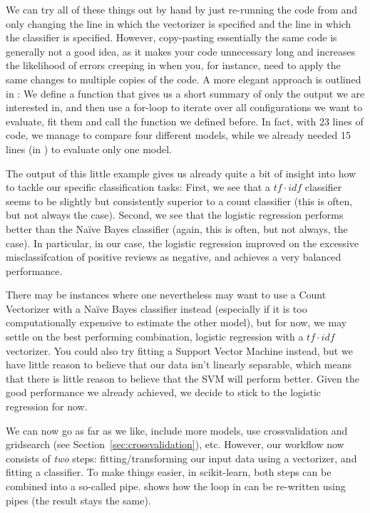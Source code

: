 We can try all of these things out by hand by just re-running the code
from  and only changing the line in which the
vectorizer is specified and the line in which the classifier is
specified.
However, copy-pasting essentially the
same code is generally not a good idea, as it makes your code unnecessary
long and increases the likelihood of errors creeping in when you, for
instance, need to apply the same changes to multiple copies of the
code.  A more elegant approach is outlined in
: We define a function that gives us a short
summary of only the output we are interested in, and then use a
for-loop to iterate over all configurations we want to evaluate, fit
them and call the function we defined before. In fact, with 23 lines
of code, we manage to compare four different models, while we already
needed 15 lines (in ) to evaluate only one model.




The output of this little example gives us already quite a bit of
insight into how to tackle our specific classification tasks: First, we
see that a $tf\cdot idf$ classifier seems to be slightly but
consistently superior to a count classifier (this is often, but not
always the case). Second, we see that the logistic regression performs
better than the Na\"ive Bayes classifier (again, this is often, but not
always, the case). In particular, in our case, the logistic regression
improved on the excessive misclassifcation of positive reviews as
negative, and achieves a very balanced performance.

There may be instances where one nevertheless may want to use a Count
Vectorizer with a Na\"ive Bayes classifier instead (especially if it
is too computationally expensive to estimate the other model), but for
now, we may settle on the best performing combination, logistic
regression with a $tf\cdot idf$ vectorizer. You could also try fitting
a Support Vector Machine instead, but we have little reason to believe
that our data isn't linearly separable, which means that there is
little reason to believe that the SVM will perform better. Given the
good performance we already achieved, we decide to stick to the
logistic regression for now.


We can now go as far as we like, include more models, use
crossvalidation and gridsearch (see
Section~\ref{sec:crossvalidation}), etc. However, our workflow now
consists of \emph{two} steps: fitting/transforming our input data
using a vectorizer, and fitting a classifier. To make things easier,
in scikit-learn, both steps can be combined into a so-called
pipe.  shows how the loop in
 can be re-written using pipes (the
result stays the same).

